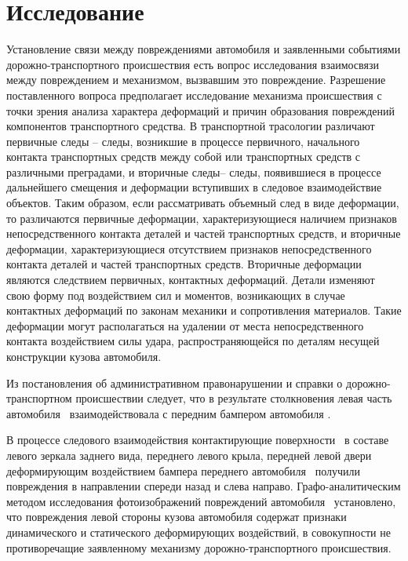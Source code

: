 \section{Исследование}
%
Установление связи между повреждениями автомобиля и заявленными событиями доро\-жно-транспортного происшествия есть вопрос  исследования   взаимосвязи между повреждением и механизмом, вызвавшим это повреждение. Разрешение поставленного вопроса предполагает исследование механизма происшествия с точки зрения анализа характера деформаций и причин образования повреждений компонентов транспортного средства.	В транспортной трасологии различают первичные следы -- следы, возникшие в процессе первичного, начального контакта транспортных средств между собой или транспортных средств с различными преградами, и вторичные следы-- следы, появившиеся в  процессе дальнейшего смещения и деформации вступивших в следовое взаимодействие объектов. Таким образом, если рассматривать объемный след в виде деформации, то различаются первичные деформации, характеризующиеся наличием признаков непосредственного контакта деталей и частей транспортных средств,  и вторичные деформации, характеризующиеся отсутствием признаков непосредственного контакта деталей и  частей транспортных средств. Вторичные деформации являются следствием первичных, контактных деформаций. Детали изменяют свою форму под воздействием сил и моментов, возникающих в случае контактных деформаций по законам механики и сопротивления материалов. Такие деформации могут располагаться на удалении от места непосредственного контакта воздействием силы удара, распространяющейся по деталям несущей конструкции кузова автомобиля.
 

 Из постановления об административном правонарушении и справки о дорожно-транс\-портном происшествии следует, что в результате столкновения левая часть автомобиля \, взаимодействовала с передним бампером автомобиля 
 \tcb.
 
   В процессе следового взаимодействия контактирующие поверхности  \, в составе левого зеркала заднего вида, переднего левого крыла, передней левой двери деформирующим воздействием бампера переднего автомобиля \tcb\, получили повреждения в направлении спереди назад и слева направо.  Графо-аналитическим методом исследования фотоизображений  повреждений автомобиля  \, установлено, что повреждения левой стороны кузова автомобиля  содержат признаки динамического и статического деформирующих воздействий, в совокупности не противоречащие заявленному механизму дорожно-транспортного происшествия.
   
